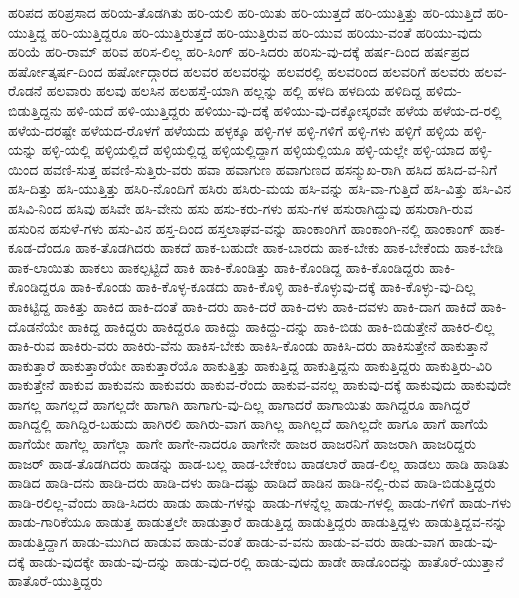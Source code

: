 {ಹರಿಪದ
ಹರಿಪ್ರಸಾದ
ಹರಿಯ-ತೊಡಗಿತು
ಹರಿ-ಯಲಿ
ಹರಿ-ಯಿತು
ಹರಿ-ಯುತ್ತದೆ
ಹರಿ-ಯುತ್ತಿತ್ತು
ಹರಿ-ಯುತ್ತಿದೆ
ಹರಿ-ಯುತ್ತಿದ್ದ
ಹರಿ-ಯುತ್ತಿದ್ದರೂ
ಹರಿ-ಯುತ್ತಿರುತ್ತದೆ
ಹರಿ-ಯುತ್ತಿರುವ
ಹರಿ-ಯುವ
ಹರಿಯು-ವಂತೆ
ಹರಿಯು-ವುದು
ಹರಿಯೆ
ಹರಿ-ರಾಮ್
ಹರಿವ
ಹರಿಸ-ಲಿಲ್ಲ
ಹರಿ-ಸಿಂಗ್
ಹರಿ-ಸಿದರು
ಹರಿಸು-ವು-ದಕ್ಕೆ
ಹರ್ಷ-ದಿಂದ
ಹರ್ಷಪ್ರದ
ಹರ್ಷೋತ್ಕರ್ಷ-ದಿಂದ
ಹರ್ಷೋದ್ಗಾರದ
ಹಲವರ
ಹಲವರನ್ನು
ಹಲವರಲ್ಲಿ
ಹಲವರಿಂದ
ಹಲವರಿಗೆ
ಹಲವರು
ಹಲವ-ರೊಡನೆ
ಹಲವಾರು
ಹಲವು
ಹಲಸಿನ
ಹಲಹಸ್ತೆ-ಯಾಗಿ
ಹಲ್ಲನ್ನು
ಹಲ್ಲಿ
ಹಳದಿ
ಹಳದಿಯ
ಹಳಿದಿದ್ದ
ಹಳಿದು-ಬಿಡುತ್ತಿದ್ದನು
ಹಳಿ-ಯದೆ
ಹಳಿ-ಯುತ್ತಿದ್ದರು
ಹಳಿಯು-ವು-ದಕ್ಕೆ
ಹಳಿಯು-ವು-ದಕ್ಕೋಸ್ಕರವೇ
ಹಳೆಯ
ಹಳೆಯ-ದ-ರಲ್ಲಿ
ಹಳೆಯ-ದರಷ್ಟೇ
ಹಳೆಯದ-ರೊಳಗೆ
ಹಳೆಯದು
ಹಳ್ಳಕ್ಕೂ
ಹಳ್ಳಿ-ಗಳ
ಹಳ್ಳಿ-ಗಳಿಗೆ
ಹಳ್ಳಿ-ಗಳು
ಹಳ್ಳಿಗೆ
ಹಳ್ಳಿಯ
ಹಳ್ಳಿ-ಯನ್ನು
ಹಳ್ಳಿ-ಯಲ್ಲಿ
ಹಳ್ಳಿಯಲ್ಲಿದೆ
ಹಳ್ಳಿಯಲ್ಲಿದ್ದ
ಹಳ್ಳಿಯಲ್ಲಿದ್ದಾಗ
ಹಳ್ಳಿಯಲ್ಲಿಯೂ
ಹಳ್ಳಿ-ಯಲ್ಲೇ
ಹಳ್ಳಿ-ಯಾದ
ಹಳ್ಳಿ-ಯಿಂದ
ಹವಣಿ-ಸುತ್ತ
ಹವಣಿ-ಸುತ್ತಿರು-ವರು
ಹವಾ
ಹವಾಗುಣ
ಹವಾಗುಣದ
ಹಸನ್ಮುಖ-ರಾಗಿ
ಹಸಿದ
ಹಸಿದ-ವ-ನಿಗೆ
ಹಸಿ-ದಿತ್ತು
ಹಸಿ-ಯುತ್ತಿತ್ತು
ಹಸಿರಿ-ನೊಂದಿಗೆ
ಹಸಿರು
ಹಸಿರು-ಮಯ
ಹಸಿ-ವನ್ನು
ಹಸಿ-ವಾ-ಗುತ್ತಿದೆ
ಹಸಿ-ವಿತ್ತು
ಹಸಿ-ವಿನ
ಹಸಿವಿ-ನಿಂದ
ಹಸಿವು
ಹಸಿವೇ
ಹಸಿ-ವೇನು
ಹಸು
ಹಸು-ಕರು-ಗಳು
ಹಸು-ಗಳ
ಹಸುರಾಗಿದ್ದುವು
ಹಸುರಾಗಿ-ರುವ
ಹಸುರಿನ
ಹಸುಳೆ-ಗಳು
ಹಸು-ವಿನ
ಹಸ್ತ-ದಿಂದ
ಹಸ್ತಲಾಘವ-ವನ್ನು
ಹಾಂಕಾಂಗಿಗೆ
ಹಾಂಕಾಂಗಿ-ನಲ್ಲಿ
ಹಾಂಕಾಂಗ್
ಹಾಕ-ಕೂಡ-ದೆಂದೂ
ಹಾಕ-ತೊಡಗಿದರು
ಹಾಕದೆ
ಹಾಕ-ಬಹುದೇ
ಹಾಕ-ಬಾರದು
ಹಾಕ-ಬೇಕು
ಹಾಕ-ಬೇಕೆಂದು
ಹಾಕ-ಬೇಡಿ
ಹಾಕ-ಲಾಯಿತು
ಹಾಕಲು
ಹಾಕಲ್ಪಟ್ಟಿದೆ
ಹಾಕಿ
ಹಾಕಿ-ಕೊಂಡಿತ್ತು
ಹಾಕಿ-ಕೊಂಡಿದ್ದ
ಹಾಕಿ-ಕೊಂಡಿದ್ದರು
ಹಾಕಿ-ಕೊಂಡಿದ್ದರೂ
ಹಾಕಿ-ಕೊಂಡು
ಹಾಕಿ-ಕೊಳ್ಳ-ಕೂಡದು
ಹಾಕಿ-ಕೊಳ್ಳಿ
ಹಾಕಿ-ಕೊಳ್ಳುವು-ದಕ್ಕೆ
ಹಾಕಿ-ಕೊಳ್ಳು-ವು-ದಿಲ್ಲ
ಹಾಕಿಟ್ಟಿದ್ದ
ಹಾಕಿತ್ತು
ಹಾಕಿದ
ಹಾಕಿ-ದಂತೆ
ಹಾಕಿ-ದರು
ಹಾಕಿ-ದರೆ
ಹಾಕಿ-ದಳು
ಹಾಕಿ-ದವಳು
ಹಾಕಿ-ದಾಗ
ಹಾಕಿದೆ
ಹಾಕಿ-ದೊಡನೆಯೇ
ಹಾಕಿದ್ದ
ಹಾಕಿದ್ದರು
ಹಾಕಿದ್ದರೂ
ಹಾಕಿದ್ದು
ಹಾಕಿದ್ದು-ದನ್ನು
ಹಾಕಿ-ಬಿಡು
ಹಾಕಿ-ಬಿಡುತ್ತೇನೆ
ಹಾಕಿರ-ಲಿಲ್ಲ
ಹಾಕಿ-ರುವ
ಹಾಕಿರು-ವರು
ಹಾಕಿರು-ವೆನು
ಹಾಕಿಸ-ಬೇಕು
ಹಾಕಿಸಿ-ಕೊಂಡು
ಹಾಕಿಸಿ-ದರು
ಹಾಕಿಸುತ್ತೇನೆ
ಹಾಕುತ್ತಾನೆ
ಹಾಕುತ್ತಾರೆ
ಹಾಕುತ್ತಾರೆಯೇ
ಹಾಕುತ್ತಾರೆಯೊ
ಹಾಕುತ್ತಿತ್ತು
ಹಾಕುತ್ತಿದ್ದ
ಹಾಕುತ್ತಿದ್ದನು
ಹಾಕುತ್ತಿದ್ದರು
ಹಾಕುತ್ತಿರು-ವಿರಿ
ಹಾಕುತ್ತೇನೆ
ಹಾಕುವ
ಹಾಕುವನು
ಹಾಕುವರು
ಹಾಕುವ-ರೆಂದು
ಹಾಕುವ-ವನಲ್ಲ
ಹಾಕುವು-ದಕ್ಕೆ
ಹಾಕುವುದು
ಹಾಕುವುದೇ
ಹಾಗಲ್ಲ
ಹಾಗಲ್ಲದೆ
ಹಾಗಲ್ಲದೇ
ಹಾಗಾಗಿ
ಹಾಗಾಗು-ವು-ದಿಲ್ಲ
ಹಾಗಾದರೆ
ಹಾಗಾಯಿತು
ಹಾಗಿದ್ದರೂ
ಹಾಗಿದ್ದರೆ
ಹಾಗಿದ್ದಲ್ಲಿ
ಹಾಗಿದ್ದಿರ-ಬಹುದು
ಹಾಗಿರಲಿ
ಹಾಗಿರು-ವಾಗ
ಹಾಗಿಲ್ಲ
ಹಾಗಿಲ್ಲದೆ
ಹಾಗಿಲ್ಲದೇ
ಹಾಗೂ
ಹಾಗೆ
ಹಾಗೆಯೆ
ಹಾಗೆಯೇ
ಹಾಗೆಲ್ಲ
ಹಾಗೆಲ್ಲಾ
ಹಾಗೇ
ಹಾಗೇ-ನಾದರೂ
ಹಾಗೇನೇ
ಹಾಜರ
ಹಾಜರನಿಗೆ
ಹಾಜರಾಗಿ
ಹಾಜರಿದ್ದರು
ಹಾಜರ್
ಹಾಡ-ತೊಡಗಿದರು
ಹಾಡನ್ನು
ಹಾಡ-ಬಲ್ಲ
ಹಾಡ-ಬೇಕೆಂಬ
ಹಾಡಲಾರೆ
ಹಾಡ-ಲಿಲ್ಲ
ಹಾಡಲು
ಹಾಡಿ
ಹಾಡಿತು
ಹಾಡಿದ
ಹಾಡಿ-ದನು
ಹಾಡಿ-ದರು
ಹಾಡಿ-ದಳು
ಹಾಡಿ-ದಷ್ಟು
ಹಾಡಿದೆ
ಹಾಡಿನ
ಹಾಡಿ-ನಲ್ಲಿ-ರುವ
ಹಾಡಿ-ಬಿಡುತ್ತಿದ್ದರು
ಹಾಡಿ-ರಲಿಲ್ಲ-ವೆಂದು
ಹಾಡಿ-ಸಿದರು
ಹಾಡು
ಹಾಡು-ಗಳನ್ನು
ಹಾಡು-ಗಳನ್ನೆಲ್ಲ
ಹಾಡು-ಗಳಲ್ಲಿ
ಹಾಡು-ಗಳಿಗೆ
ಹಾಡು-ಗಳು
ಹಾಡು-ಗಾರಿಕೆಯೂ
ಹಾಡುತ್ತ
ಹಾಡುತ್ತಲೇ
ಹಾಡುತ್ತಾರೆ
ಹಾಡುತ್ತಿದ್ದ
ಹಾಡುತ್ತಿದ್ದರು
ಹಾಡುತ್ತಿದ್ದಳು
ಹಾಡುತ್ತಿದ್ದವ-ನನ್ನು
ಹಾಡುತ್ತಿದ್ದಾಗ
ಹಾಡು-ಮುಗಿದ
ಹಾಡುವ
ಹಾಡು-ವಂತೆ
ಹಾಡು-ವ-ವನು
ಹಾಡು-ವ-ವರು
ಹಾಡು-ವಾಗ
ಹಾಡು-ವು-ದಕ್ಕೆ
ಹಾಡು-ವುದಕ್ಕೇ
ಹಾಡು-ವು-ದನ್ನು
ಹಾಡು-ವುದ-ರಲ್ಲಿ
ಹಾಡು-ವುದು
ಹಾಡೇ
ಹಾಡೊಂದನ್ನು
ಹಾತೊರೆ-ಯುತ್ತಾನೆ
ಹಾತೊರೆ-ಯುತ್ತಿದ್ದರು
}
